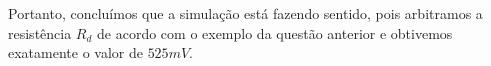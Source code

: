 \documentclass[a4paper, 12pt]{article}
\begin{document}
Portanto, concluímos que a simulação está fazendo sentido, pois arbitramos a resistência $R_d$ de acordo com o exemplo da questão anterior e obtivemos exatamente o valor de $525 mV$.









\newpage
\end{document}
